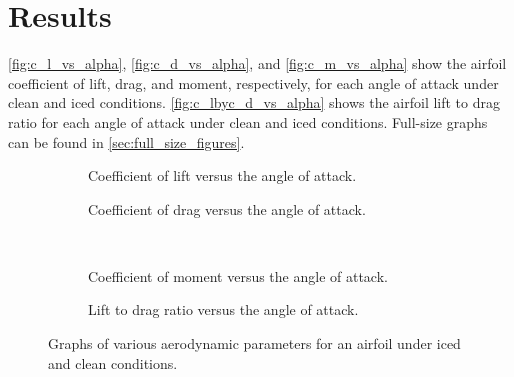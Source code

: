\chapter{Results} \label{cp:results}

\autoref{fig:c_l_vs_alpha}, \autoref{fig:c_d_vs_alpha}, and \autoref{fig:c_m_vs_alpha} show the airfoil coefficient of lift, drag, and moment, respectively, for each angle of attack under clean and iced conditions. \autoref{fig:c_lbyc_d_vs_alpha} shows the airfoil lift to drag ratio for each angle of attack under clean and iced conditions. Full-size graphs can be found in \autoref{sec:full_size_figures}.

\begin{figure}[htpb]
    \centering
    \begin{subfigure}{0.49\textwidth}
        \centering
        
        \caption{Coefficient of lift versus the angle of attack.}
        \label{fig:c_l_vs_alpha}
    \end{subfigure}
    \begin{subfigure}{0.49\textwidth}
        \centering
        
        \caption{Coefficient of drag versus the angle of attack.}
        \label{fig:c_d_vs_alpha}
    \end{subfigure} \\
    \begin{subfigure}{0.49\textwidth}
        \centering
        
        \caption{Coefficient of moment versus the angle of attack.}
        \label{fig:c_m_vs_alpha}
    \end{subfigure}
    \begin{subfigure}{0.49\textwidth}
        \centering
        
        \caption{Lift to drag ratio versus the angle of attack.}
        \label{fig:c_lbyc_d_vs_alpha}
    \end{subfigure}
    \caption{Graphs of various aerodynamic parameters for an airfoil under iced and clean conditions.}
    \label{fig:results}
\end{figure}